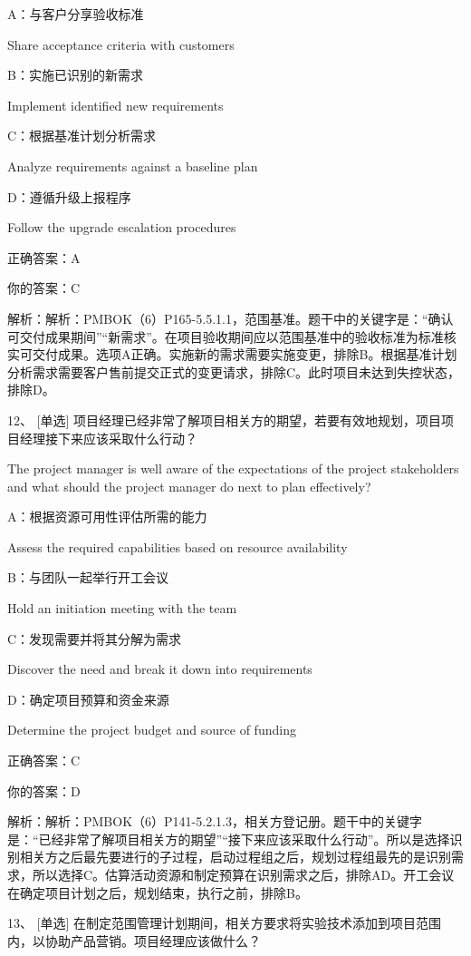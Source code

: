 A：与客户分享验收标准

Share acceptance criteria with customers

B：实施已识别的新需求

Implement identified new requirements

C：根据基准计划分析需求

Analyze requirements against a baseline plan

D：遵循升级上报程序

Follow the upgrade escalation procedures

正确答案：A

你的答案：C

解析：解析：PMBOK（6）P165-5.5.1.1，范围基准。题干中的关键字是：“确认可交付成果期间”“新需求”。在项目验收期间应以范围基准中的验收标准为标准核实可交付成果。选项A正确。实施新的需求需要实施变更，排除B。根据基准计划分析需求需要客户售前提交正式的变更请求，排除C。此时项目未达到失控状态，排除D。



12、 [单选] 项目经理已经非常了解项目相关方的期望，若要有效地规划，项目项目经理接下来应该采取什么行动？

The project manager is well aware of the expectations of the project stakeholders and what should the project manager do next to plan effectively?

A：根据资源可用性评估所需的能力

Assess the required capabilities based on resource availability

B：与团队一起举行开工会议

Hold an initiation meeting with the team

C：发现需要并将其分解为需求

Discover the need and break it down into requirements

D：确定项目预算和资金来源

Determine the project budget and source of funding

正确答案：C

你的答案：D

解析：解析：PMBOK（6）P141-5.2.1.3，相关方登记册。题干中的关键字是：“已经非常了解项目相关方的期望”“接下来应该采取什么行动”。所以是选择识别相关方之后最先要进行的子过程，启动过程组之后，规划过程组最先的是识别需求，所以选择C。估算活动资源和制定预算在识别需求之后，排除AD。开工会议在确定项目计划之后，规划结束，执行之前，排除B。


13、 [单选] 在制定范围管理计划期间，相关方要求将实验技术添加到项目范围内，以协助产品营销。项目经理应该做什么？

